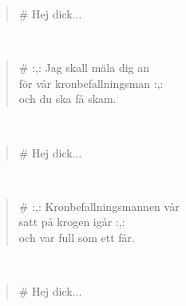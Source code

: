 \noindent\begin{minipage}{\linewidth}
\begin{verse}
	\hspace{0pt-\widthof{\# }}\# Hej dick...\\
\end{verse}
\end{minipage}\\[10pt]
\noindent\begin{minipage}{\linewidth}
\begin{verse}
	\hspace{0pt-\widthof{\# }-\widthof{:,: }}\# :,: Jag skall mäla dig an\\
	för vår kronbefallningsman :,:\\
	och du ska få skam.\\
\end{verse}
\end{minipage}\\[10pt]
\noindent\begin{minipage}{\linewidth}
\begin{verse}
	\hspace{0pt-\widthof{\# }}\# Hej dick...\\
\end{verse}
\end{minipage}\\[10pt]
\noindent\begin{minipage}{\linewidth}
\begin{verse}
	\hspace{0pt-\widthof{\# }-\widthof{:,: }}\# :,: Kronbefallningsmannen vår\\
	satt på krogen igår :,:\\
	och var full som ett får.\\
\end{verse}
\end{minipage}\\[10pt]
\noindent\begin{minipage}{\linewidth}
\begin{verse}
	\hspace{0pt-\widthof{\# }}\# Hej dick...\\
\end{verse}
\end{minipage}\\[10pt]
%
%
